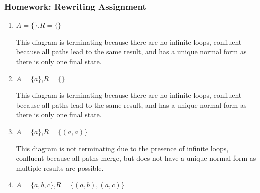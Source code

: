 \documentclass{article}
\theoremstyle{theorem}
\theoremstyle{definition}
\theoremstyle{remark}
\begin{document}
\subsubsection{Homework: Rewriting Assignment}
\begin{enumerate}
    \item $A = \{ \}$,\quad $R = \{ \}$

    \begin{center}
    \end{center}
    This diagram is terminating because there are no infinite loops, confluent because all paths lead to the same result, and has a unique normal form as there is only one final state.

\vspace{2em}

    \item $A = \{ a \}$,\quad $R = \{ \}$

    \begin{center}
    \end{center}
    This diagram is terminating because there are no infinite loops, confluent because all paths lead to the same result, and has a unique normal form as there is only one final state.

\vspace{2em}

    \item $A = \{ a \}$,\quad $R = \{ (a,a) \}$

    \begin{center}
    \end{center}
    This diagram is not terminating due to the presence of infinite loops, confluent because all paths merge, but does not have a unique normal form as multiple results are possible.

\vspace{2em}

    \item $A = \{ a, b, c \}$,\quad $R = \{ (a,b), (a,c) \}$


\end{enumerate}
\end{document}
